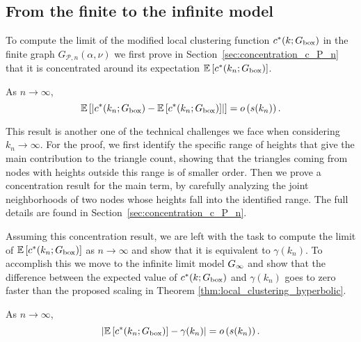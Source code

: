 \subsection{From the finite to the infinite model}

To compute the limit of the modified local clustering function $c^\ast(k; G_{\text{box}})$ in the finite graph $G_{\mathcal{P},n}(\alpha, \nu)$ we first prove in Section~\ref{sec:concentration_c_P_n} that it is concentrated around its expectation $\mathbb{E}\left[c^\ast(k_n; G_{\text{box}})\right]$.


\begin{proposition}\label{prop:concentration_local_clustering_P_n}
As $n \to \infty$,
\[
	\mathbb{E}\left[\left|c^\ast(k_n; G_{\text{box}}) - \mathbb{E}\left[c^\ast(k_n; G_{\text{box}})\right]\right|\right] = o\left(s(k_n)\right).
\]
\end{proposition}

This result is another one of the technical challenges we face when considering $k_n \to \infty$. For the proof, we first identify the specific range of heights that give the main contribution to the triangle count, showing that the triangles coming from nodes with heights outside this range is of smaller order. Then we prove a concentration result for the main term, by carefully analyzing the joint neighborhoods of two nodes whose heights fall into the identified range. The full details are found in Section~\ref{sec:concentration_c_P_n}.

Assuming this concentration result, we are left with the task to compute the limit of $\mathbb{E}\left[c^\ast(k_n; G_{\text{box}})\right]$ as $n \to \infty$ and show that it is equivalent to $\gamma(k_n)$. To accomplish this we move to the infinite limit model $G_{\infty}$ and show that the difference between the expected value of $c^\ast(k;G_{\text{box}})$ and $\gamma(k_n)$ goes to zero faster than the proposed scaling in Theorem \ref{thm:local_clustering_hyperbolic}.

\begin{proposition}\label{prop:convergence_average_clustering_P_n}
As $n \to \infty$,
\[
	\left|\mathbb{E}\left[c^\ast(k_n; G_{\text{box}})\right] - \gamma(k_n)\right| = o\left(s(k_n)\right).
\]
\end{proposition}

